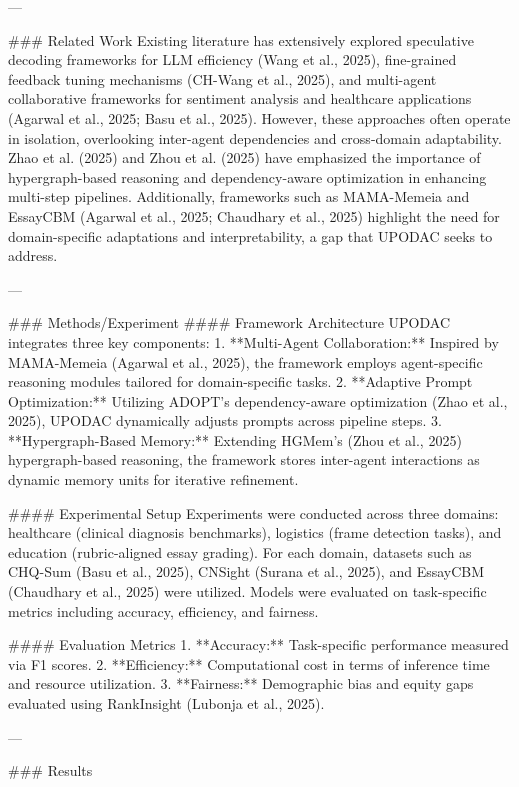 ---

### Related Work  
Existing literature has extensively explored speculative decoding frameworks for LLM efficiency (Wang et al., 2025), fine-grained feedback tuning mechanisms (CH-Wang et al., 2025), and multi-agent collaborative frameworks for sentiment analysis and healthcare applications (Agarwal et al., 2025; Basu et al., 2025). However, these approaches often operate in isolation, overlooking inter-agent dependencies and cross-domain adaptability. Zhao et al. (2025) and Zhou et al. (2025) have emphasized the importance of hypergraph-based reasoning and dependency-aware optimization in enhancing multi-step pipelines. Additionally, frameworks such as MAMA-Memeia and EssayCBM (Agarwal et al., 2025; Chaudhary et al., 2025) highlight the need for domain-specific adaptations and interpretability, a gap that UPODAC seeks to address.

---

### Methods/Experiment  
#### Framework Architecture  
UPODAC integrates three key components:  
1. **Multi-Agent Collaboration:** Inspired by MAMA-Memeia (Agarwal et al., 2025), the framework employs agent-specific reasoning modules tailored for domain-specific tasks.  
2. **Adaptive Prompt Optimization:** Utilizing ADOPT's dependency-aware optimization (Zhao et al., 2025), UPODAC dynamically adjusts prompts across pipeline steps.  
3. **Hypergraph-Based Memory:** Extending HGMem's (Zhou et al., 2025) hypergraph-based reasoning, the framework stores inter-agent interactions as dynamic memory units for iterative refinement.

#### Experimental Setup  
Experiments were conducted across three domains: healthcare (clinical diagnosis benchmarks), logistics (frame detection tasks), and education (rubric-aligned essay grading). For each domain, datasets such as CHQ-Sum (Basu et al., 2025), CNSight (Surana et al., 2025), and EssayCBM (Chaudhary et al., 2025) were utilized. Models were evaluated on task-specific metrics including accuracy, efficiency, and fairness.

#### Evaluation Metrics  
1. **Accuracy:** Task-specific performance measured via F1 scores.  
2. **Efficiency:** Computational cost in terms of inference time and resource utilization.  
3. **Fairness:** Demographic bias and equity gaps evaluated using RankInsight (Lubonja et al., 2025).  

---

### Results  

